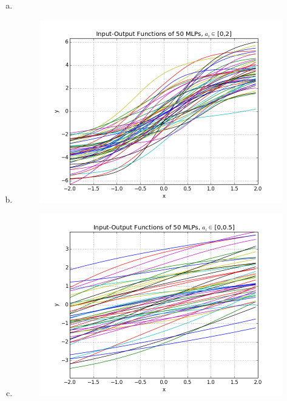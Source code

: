 \documentclass[11pt,a4paper]{article}
\begin{document}
\begin{enumerate}[a)]
\item

\item
\begin{figure}[h]
  \centering
  \includegraphics[width=13 cm]{23b.png}
  \label{23b}
\end{figure}


\item
\begin{figure}[h]
  \centering
  \includegraphics[width=13 cm]{23c.png}
  \label{23c}
\end{figure}


\end{enumerate}
\end{document}
